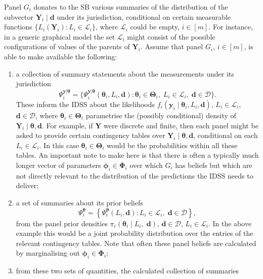 Panel $G_i$ donates to the SB various summaries of the distribution of the subvector $\bm{Y}_i\;|\;\bm{d}$ under its jurisdiction, conditional on certain measurable functions $\{L_i(\bm{Y}_i):L_i\in\mathcal{L}_i\}$, where $\mathcal{L}_i$ could be empty, $i\in[m]$. For instance, in a generic graphical model the set $\mathcal{L}_i$ might consist of the possible configurations of values of the parents of $\bm{Y}_i$. Assume that panel $G_i$, $i\in [m]$, is able to make available the following:
\begin{enumerate}
\item a collection of summary statements about the measurements under its jurisdiction
\begin{equation*}
\Psi_i^{\bm{y}|\bm{\theta}}=\{\Psi_i^{\bm{y}|\bm{\theta}}(\bm{\theta}_i,L_i,\bm{d}): \bm{\theta}_i\in\bm{\Theta}_i,\;L_i\in\mathcal{L}_i,\;\bm{d}\in\bm{\mathcal{D}}\}.
\end{equation*}
These inform the IDSS about the likelihoods
$f_i(\bm{y}_{i}\;|\;\bm{\theta }_{i},L_i, \bm{d})$, $L_i\in \mathcal{L}_i$, $\bm{d}\in \bm{\mathcal{D}}$, where $\bm{\theta }_{i}\in \bm{\Theta} _{i}$ parametrise the (possibly conditional) density of $\bm{Y}_i\;|\;\bm{\theta},\bm{d}$. For example, if $\bm{Y}$ were discrete and finite, then each panel might be asked to provide certain contingency tables over $\bm{Y}_{i}\;|\;\bm{\theta},\bm{d}$, conditional on each $L_{i}\in \mathcal{L}_{i}$. In this case $\bm{\theta}_{i}\in \bm{\Theta} _{i}$ would be the probabilities within all these tables. An important note to make here is that there is often a typically much longer vector of parameters $\bm{\phi}_{i}\in \bm{\Phi} _{i}$ over which $G_{i}$ has beliefs but which are not directly relevant to the distribution of the predictions the IDSS needs to deliver;
\item a set of summaries about its prior beliefs  
\begin{equation*}
\Psi _{i}^{\bm{\theta} }=\left\{ \Psi _{i}^{\bm{\theta} }(L_i,\bm{d}): L_i\in\mathcal{L}_i,\;\bm{d}\in\bm{\mathcal{D}} \right\}, 
\end{equation*}
from the panel prior densities $\pi_i(\bm{\theta}_i\;|\;L_i,\;\bm{d})$, $\bm{d}\in\bm{\mathcal{D}}$, $L_i\in\mathcal{L}_i$. In the above example this would be a joint probability distribution over the entries of the relevant contingency tables. Note that often these panel beliefs are calculated by marginalising out $ \bm{\phi }_{i}\in \bm{\Phi}_{i}$;
\item from these two sets of quantities, the calculated collection of summaries 

\end{enumerate}
